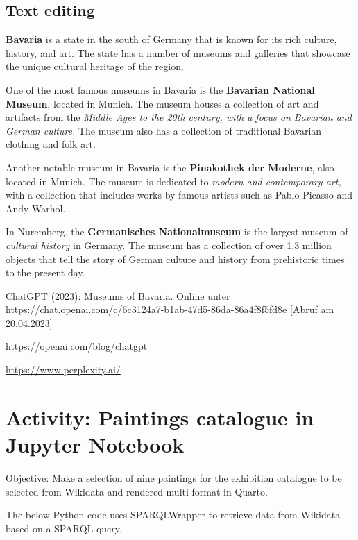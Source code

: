\documentclass[
  letterpaper,
]{book}
\begin{document}
\hypertarget{text-editing}{%
\section{Text editing}\label{text-editing}}

\textbf{Bavaria} is a state in the south of Germany that is known for
its rich culture, history, and art. The state has a number of museums
and galleries that showcase the unique cultural heritage of the region.

One of the most famous museums in Bavaria is the \textbf{Bavarian
National Museum}, located in Munich. The museum houses a collection of
art and artifacts from the \emph{Middle Ages to the 20th century, with a
focus on Bavarian and German culture.} The museum also has a collection
of traditional Bavarian clothing and folk art.

Another notable museum in Bavaria is the \textbf{Pinakothek der
Moderne}, also located in Munich. The museum is dedicated to
\emph{modern and contemporary art,} with a collection that includes
works by famous artists such as Pablo Picasso and Andy Warhol.

In Nuremberg, the \textbf{Germanisches Nationalmuseum} is the largest
museum of \emph{cultural history} in Germany. The museum has a
collection of over 1.3 million objects that tell the story of German
culture and history from prehistoric times to the present day.

ChatGPT (2023): Museums of Bavaria. Online unter
https://chat.openai.com/c/6c3124a7-b1ab-47d5-86da-86a4f8f5fd8e {[}Abruf
am 20.04.2023{]}

\url{https://openai.com/blog/chatgpt}

\url{https://www.perplexity.ai/}


\hypertarget{activity-paintings-catalogue-in-jupyter-notebook}{%
\chapter{Activity: Paintings catalogue in Jupyter
Notebook}\label{activity-paintings-catalogue-in-jupyter-notebook}}

Objective: Make a selection of nine paintings for the exhibition
catalogue to be selected from Wikidata and rendered multi-format in
Quarto.

The below Python code uses SPARQLWrapper to retrieve data from Wikidata
based on a SPARQL query.
\end{document}
